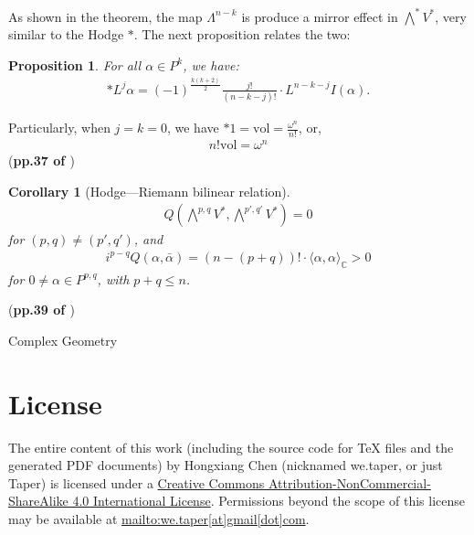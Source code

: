 \documentclass{book}
\numberwithin{equation}{subsection} %
\newtheorem{prop}{Proposition}[section]
\newtheorem{coro}{Corollary}[section]
\theoremstyle{definition}
\begin{document}
As shown in the theorem, the map $\Lambda^{n-k}$ is produce a mirror
effect in $\bigwedge^*V^*$, very similar to the Hodge $*$.
The next proposition relates the two:

\begin{prop}
    For all $\alpha\in P^k$, we have:
    \begin{align}
        *L^j \alpha = (-1)^{\frac{k(k+2)}{2}}
            \frac{j!}{(n-k-j)!}\cdot L^{n-k-j}I(\alpha).
    \end{align}
\end{prop}
Particularly, when $j=k=0$, we have $*1=\text{vol} = \frac{\omega^n}{n!}$,
or,
\begin{align}
    n!\text{vol} = \omega^n
\end{align}
(\textbf{pp.37 of \cite{book}})

\begin{coro}[Hodge—Riemann bilinear relation]
    \begin{align}
        Q(\bigwedge^{p,q}V^*, \bigwedge^{p',q'}V^*)=0
    \end{align}
    for $(p,q)\neq (p',q')$, and
    \begin{align}
        i^{p-q}Q(\alpha,\bar\alpha)=(n-(p+q))! \cdot
        \langle\alpha,\alpha\rangle_{\mathbb{C}}>0
    \end{align}
    for $0\neq\alpha\in P^{p,q}$, with $p+q\leq n$.
\end{coro}
(\textbf{pp.39 of \cite{book}})
\begin{thebibliography}{1}
	 Complex Geometry
\end{thebibliography}
\part{License}
The entire content of this work (including the source code
for TeX files and the generated PDF documents) by 
Hongxiang Chen (nicknamed we.taper, or just Taper) is
licensed under a 
\href{http://creativecommons.org/licenses/by-nc-sa/4.0/}{Creative 
Commons Attribution-NonCommercial-ShareAlike 4.0 International 
License}. Permissions beyond the scope of this 
license may be available at \url{mailto:we.taper[at]gmail[dot]com}.
\end{document}
